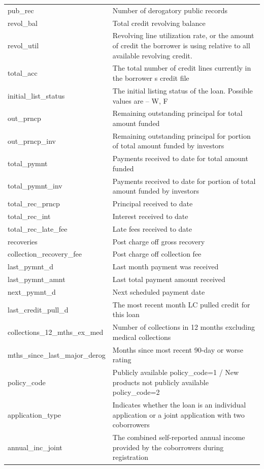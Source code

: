 \documentclass[11pt,]{report}
\begin{document}
\begin{longtable}[t]{>{\raggedright\arraybackslash}p{7cm}>{\raggedright\arraybackslash}p{7cm}}
pub\_rec & Number of derogatory public records\\
\addlinespace
revol\_bal & Total credit revolving balance\\
revol\_util & Revolving line utilization rate, or the amount of credit the borrower is using relative to all available revolving credit.\\
total\_acc & The total number of credit lines currently in the borrower s credit file\\
initial\_list\_status & The initial listing status of the loan. Possible values are – W, F\\
out\_prncp & Remaining outstanding principal for total amount funded\\
\addlinespace
out\_prncp\_inv & Remaining outstanding principal for portion of total amount funded by investors\\
total\_pymnt & Payments received to date for total amount funded\\
total\_pymnt\_inv & Payments received to date for portion of total amount funded by investors\\
total\_rec\_prncp & Principal received to date\\
total\_rec\_int & Interest received to date\\
\addlinespace
total\_rec\_late\_fee & Late fees received to date\\
recoveries & Post charge off gross recovery\\
collection\_recovery\_fee & Post charge off collection fee\\
last\_pymnt\_d & Last month payment was received\\
last\_pymnt\_amnt & Last total payment amount received\\
\addlinespace
next\_pymnt\_d & Next scheduled payment date\\
last\_credit\_pull\_d & The most recent month LC pulled credit for this loan\\
collections\_12\_mths\_ex\_med & Number of collections in 12 months excluding medical collections\\
mths\_since\_last\_major\_derog & Months since most recent 90-day or worse rating\\
policy\_code & Publicly available policy\_code=1 / New products not publicly available policy\_code=2\\
\addlinespace
application\_type & Indicates whether the loan is an individual application or a joint application with two coborrowers\\
annual\_inc\_joint & The combined self-reported annual income provided by the coborrowers during registration\\

\end{longtable}
\end{document}
